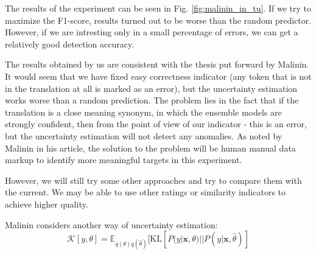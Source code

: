 \documentclass[a4paper,14pt]{extarticle}
\begin{document}
	\begin{figure}[t]
	\end{figure}
	The results of the experiment can be seen in Fig. \ref{fig:malinin_in_tu}. If we try to maximize the F1-score, results turned out to be worse than the random predictor. However, if we are intresting only in a small percentage of errors, we can get a relatively good detection accuracy.

	The results obtained by us are consistent with the thesis put forward by Malinin. It would seem that we have fixed easy correctness indicator (any token that is not in the translation at all is marked as an error), but the uncertainty estimation works worse than a random prediction. The problem lies in the fact that if the translation is a close meaning synonym, in which the ensemble models are strongly confident, then from the point of view of our indicator - this is an error, but the uncertainty estimation will not detect any anomalies. As noted by Malinin in his article, the solution to the problem will be human manual data markup to identify more meaningful targets in this experiment.

	However, we will still try some other approaches and try to compare them with the current. We may be able to use other ratings or similarity indicators to achieve higher quality.
	
	Malinin considers another way of uncertainty estimation:
	\begin{equation*}
		\mathcal{K}[y, \theta] = \mathbb{E}_{q(\theta)q(\hat{\theta})}[
			\mathrm{KL}[P(y|\textbf{x}, \theta) || P(y|\textbf{x}, \hat{\theta})
		]
	\end{equation*}
	
\end{document}

